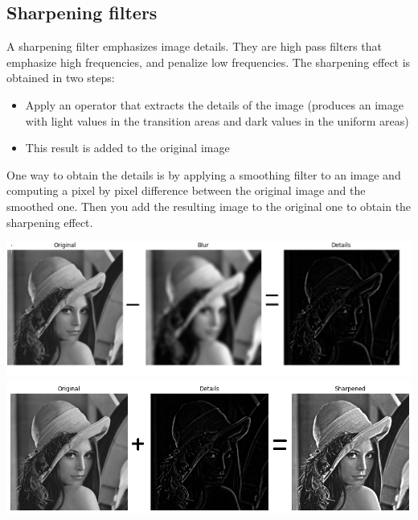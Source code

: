 \subsection{Sharpening filters}
A sharpening filter emphasizes image details. They are high pass filters that emphasize high frequencies, and penalize low frequencies.\newline
The sharpening effect is obtained in two steps:
\begin{itemize}
    \item Apply an operator that extracts the details of the image (produces an image with light values in the transition areas and dark values in the uniform areas)
    \item This result is added to the original image
\end{itemize}
One way to obtain the details is by applying a smoothing filter to an image and computing a pixel by pixel difference between the original image and the smoothed one. Then you add the resulting image to the original one to obtain the sharpening effect.
\begin{flushleft}
\includegraphics[scale=0.6]{images/details.png}
\includegraphics[scale = 0.8]{images/Lena sharpened.png}
\end{flushleft}

